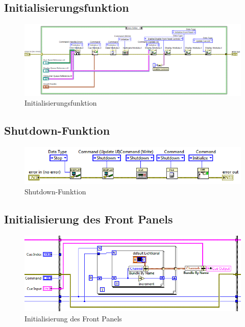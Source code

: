 \appendix
\renewcommand{\listtablename}{Anhang}
\renewcommand{\lstlistingname}{} 
\renewcommand{\thelstlisting}{Quellcode \arabic{lstlisting}}
\listoftables
{}

	\newpage	
	\subsection{Initialisierungsfunktion}
	\label{a1}
	\begin{figure}[!h]
	\centering
		\includegraphics[angle=90, height=0.8\textheight ]{Pics/init.png}
	\caption{Initialisierungsfunktion}
	\label{fig:a1}
	\end{figure}
	\newpage
	
	\subsection{Shutdown-Funktion}
	\begin{figure}[!h]
	\centering
		\includegraphics[width=\textwidth]{Pics/shutdown.png}
	\caption{Shutdown-Funktion}
	\label{fig:a2}
	\end{figure}
	


	\subsection{Initialisierung des Front Panels}
	\begin{figure}[!h]
	\centering
		\includegraphics[width=\textwidth]{Pics/init-front.png}
	\caption{Initialisierung des Front Panels}
	\label{fig:a3}
	\end{figure}
	


